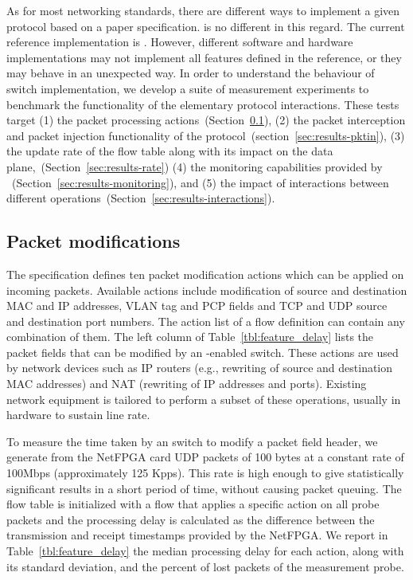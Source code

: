As for most networking standards, there are different ways to implement a
given protocol based on a paper specification. \of is no different in this
regard. The current \of reference implementation is \ovs
\cite{openvswitch}. However, different software and hardware implementations may
not implement all features defined in the \ovs reference, or they may
behave in an unexpected way. In order to understand the behaviour of switch \of
implementation, we develop a suite of measurement experiments to
benchmark the functionality of the elementary protocol interactions.  These
tests target (1) the \of packet processing
actions~(Section~\ref{sec:results-packets}), (2)
the packet interception and packet injection functionality of the
protocol~(section~\ref{sec:results-pktin}), (3) the update rate of the \of flow table along
with its impact on the data plane,~(Section~\ref{sec:results-rate}) (4) the monitoring
capabilities provided by \of~(Section~\ref{sec:results-monitoring}), and (5) the impact of interactions between
different \of operations~(Section~\ref{sec:results-interactions}).


\subsection{Packet modifications}\label{sec:results-packets}

The \of specification \cite{openflow-spec} defines ten packet modification
actions which can be applied on incoming packets. Available actions include
modification of source and destination MAC and IP addresses, VLAN tag and PCP
fields and TCP and UDP source and destination port numbers. The action list
of a flow definition can contain any combination of them. The left column of
Table~\ref{tbl:feature_delay} lists the packet fields that can be modified by an
\of-enabled switch.  These actions are used by network devices such as IP
routers (e.g., rewriting of source and destination MAC addresses) and NAT
(rewriting of IP addresses and ports). Existing network equipment is tailored to
perform a subset of these operations, usually in hardware to sustain line rate.

To measure the time taken by an \of switch to modify a packet field header, we
generate from the NetFPGA card UDP packets of 100 bytes at a constant rate of
100Mbps (approximately 125 Kpps).  This rate is high enough to give
statistically significant results in a short period of time, without causing
packet queuing.  The flow table is initialized with a flow that applies a
specific action on all probe packets and the processing delay is calculated as
the difference between the transmission and receipt timestamps provided by the
NetFPGA.  We report in Table~\ref{tbl:feature_delay} the median processing delay
for each action, along with its standard deviation, and the percent of lost
packets of the measurement probe.

